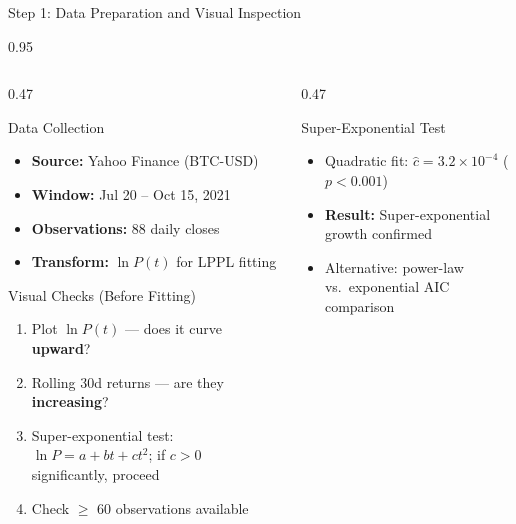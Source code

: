 \documentclass[9pt, aspectratio=169, t]{beamer}
\begin{document}
\begin{frame}{Step 1: Data Preparation and Visual Inspection}
    \begin{cminipage}{0.95\textwidth}
    {\footnotesize
    \begin{columns}[T]
        \begin{column}{0.47\textwidth}
            \begin{block}{Data Collection}
                \begin{itemize}\setlength{\itemsep}{0pt}
                    \item \textbf{Source:} Yahoo Finance (BTC-USD)
                    \item \textbf{Window:} Jul 20 -- Oct 15, 2021
                    \item \textbf{Observations:} 88 daily closes
                    \item \textbf{Transform:} $\ln P(t)$ for LPPL fitting
                \end{itemize}
            \end{block}

            \begin{exampleblock}{Visual Checks (Before Fitting)}
                \begin{enumerate}\setlength{\itemsep}{0pt}
                    \item Plot $\ln P(t)$ --- does it curve \textbf{upward}?
                    \item Rolling 30d returns --- are they \textbf{increasing}?
                    \item Super-exponential test: $\ln P = a + bt + ct^2$; if $c > 0$ significantly, proceed
                    \item Check $\geq$ 60 observations available
                \end{enumerate}
            \end{exampleblock}
        \end{column}
        \begin{column}{0.47\textwidth}
            \begin{alertblock}{Super-Exponential Test}
                \begin{itemize}\setlength{\itemsep}{0pt}
                    \item Quadratic fit: $\hat{c} = 3.2 \times 10^{-4}$ ($p < 0.001$)
                    \item \textbf{Result:} Super-exponential growth confirmed
                    \item Alternative: power-law vs.\ exponential AIC comparison
                \end{itemize}
            \end{alertblock}


\end{column}
\end{columns}}
\end{cminipage}
\end{frame}
\end{document}
